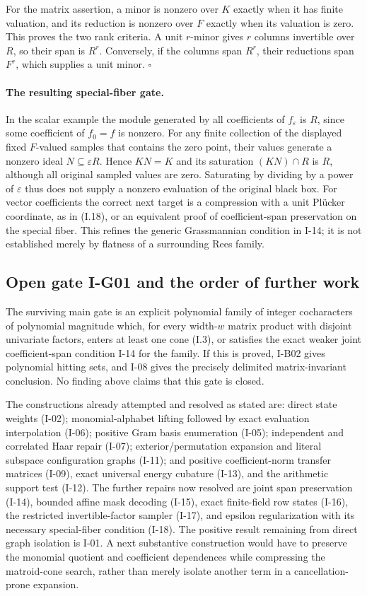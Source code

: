 \documentclass[11pt,a4paper]{article}
\theoremstyle{definition}\newtheorem{definition}{Definition}
\begin{document}
For the matrix assertion, a minor is nonzero over $K$ exactly when
it has finite valuation, and its reduction is nonzero over $F$
exactly when its valuation is zero.  This proves the two rank
criteria.  A unit $r$-minor gives $r$ columns invertible over $R$,
so their span is $R^r$.  Conversely, if the columns span $R^r$,
their reductions span $F^r$, which supplies a unit minor.
\hfill$\square$

\paragraph{The resulting special-fiber gate.}
In the scalar example the module generated by all coefficients of
$f_\varepsilon$ is $R$, since some coefficient of $f_0=f$ is nonzero.
For any finite collection of the displayed fixed $F$-valued samples
that contains the zero point, their values generate a nonzero ideal $N\subseteq
\varepsilon R$.  Hence $K N=K$ and its saturation
$(KN)\cap R$ is $R$, although all original sampled values are zero.
Saturating by dividing by a power of $\varepsilon$ thus does not
supply a nonzero evaluation of the original black box.
For vector coefficients the correct next target is a compression
with a unit Pl\"ucker coordinate, as in (I.18), or an equivalent
proof of coefficient-span preservation on the special fiber.
This refines the generic Grassmannian condition in I-14; it is not
established merely by flatness of a surrounding Rees family.

\subsection{Open gate I-G01 and the order of further work}
\label{I-G01}

The surviving main gate is an explicit polynomial family of
integer cocharacters of polynomial magnitude which, for every
width-$w$ matrix product with disjoint univariate factors,
enters at least one cone (I.3), or satisfies the exact weaker joint
coefficient-span condition I-14 for the family.  If this is
proved, I-B02 gives polynomial hitting sets, and I-08 gives the
precisely delimited matrix-invariant conclusion.  No finding
above claims that this gate is closed.

The constructions already attempted and resolved as stated are:
direct state weights (I-02); monomial-alphabet lifting followed
by exact evaluation interpolation (I-06); positive Gram basis
enumeration (I-05); independent and correlated Haar repair
(I-07); exterior/permutation expansion and literal subspace
configuration graphs (I-11); and positive coefficient-norm
transfer matrices (I-09), exact universal energy cubature (I-13),
and the arithmetic support test (I-12).  The further repairs now
resolved are joint span preservation (I-14), bounded affine mask
decoding (I-15), exact finite-field row states (I-16), the restricted
invertible-factor sampler (I-17), and epsilon regularization with
its necessary special-fiber condition (I-18).  The positive result remaining from
direct graph isolation is I-01.  A next substantive construction
would have to preserve the monomial quotient and coefficient
dependences while compressing the matroid-cone search, rather
than merely isolate another term in a cancellation-prone
expansion.
\end{document}
